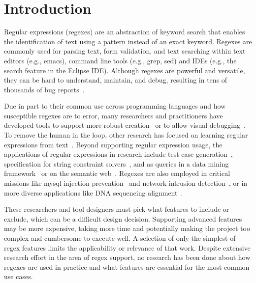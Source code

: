 \section{Introduction }

Regular expressions (regexes) are an abstraction of keyword search that enables the identification of text using a pattern instead of an exact keyword.
Regexes are commonly used for parsing text, form validation, and text searching within text editors (e.g., emacs), command line tools (e.g., grep, sed) and IDEs (e.g., the search feature in the Eclipse IDE).  Although regexes are powerful and versatile, they can be hard to understand,  maintain, and debug, resulting in tens of thousands of bug reports~\cite{Spishak:2012:TSR:2318202.2318207}.

Due in part to their common use across programming languages and how susceptible regexes are to error, many researchers and practitioners have developed tools to support more robust creation~\cite{Spishak:2012:TSR:2318202.2318207} or to allow visual debugging~\cite{Beck:2014:RVD:2591062.2591111}. To remove the human in the loop, other research has focused on learning regular expressions from  text~\cite{Babbar:2010:CBA:1871840.1871848, Li:2008:REL:1613715.1613719}.
Beyond supporting regular expression usage, the applications of regular expressions in research include test case generation~\cite{Ghosh:2013:JAT:2486788.2486925, Galler:2014:STD:2683035.2683100, Anand:2013:OSM:2503903.2503991, Tillmann:2014:TAT:2642937.2642941},
specification for string constraint solvers~\cite{Trinh:2014:SSS:2660267.2660372, hampi}, and as queries in a data mining framework~\cite{Begel:2010:CDE:1806799.1806821} or on the semantic web~\cite{Lee:2010:PSQ:1871871.1871877}.
Regexes are also employed in critical missions like mysql injection prevention~\cite{Yeole:2011:ADT:1980022.1980229} and network intrusion detection~\cite{network}, or in more diverse applications like DNA sequencing alignment~\cite{1594922}.

These researchers and tool designers must pick what features to include or exclude, which  can be a difficult  design decision. Supporting advanced features may be more expensive, taking more time and potentially making the project too complex and cumbersome to execute well.  A selection of only the simplest of regex features limits the applicability or relevance of that work. Despite extensive research effort in the area of regex support,  no research has been done about how regexes are used in practice and what features are essential for the most common use cases.


